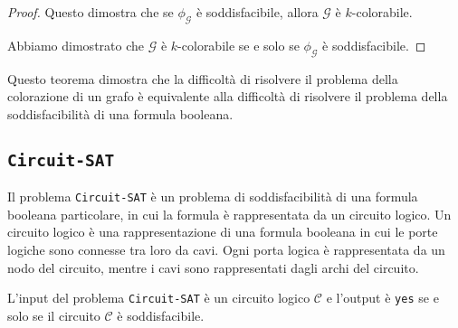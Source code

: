 \begin{proof}
    Questo dimostra che se $\phi_\mathcal{G}$ è soddisfacibile, allora $\mathcal{G}$ è
    $k$-colorabile.

    Abbiamo dimostrato che $\mathcal{G}$ è $k$-colorabile se e solo se $\phi_\mathcal{G}$ è
    soddisfacibile. 
\end{proof}
Questo teorema dimostra che la difficoltà di risolvere il problema della colorazione di un grafo
è equivalente alla difficoltà di risolvere il problema della soddisfacibilità di una formula
booleana. 

\subsection{\texttt{Circuit-SAT}}
Il problema \texttt{Circuit-SAT} è un problema di soddisfacibilità di una formula booleana
particolare, in cui la formula è rappresentata da un circuito logico. Un circuito logico è una
rappresentazione di una formula booleana in cui le porte logiche sono connesse tra loro da
cavi. Ogni porta logica è rappresentata da un nodo del circuito, mentre i cavi sono rappresentati
dagli archi del circuito.

L'input del problema \texttt{Circuit-SAT} è un circuito logico $\mathcal{C}$ e
l'output è \texttt{yes} se e solo se il circuito $\mathcal{C}$ è soddisfacibile.

